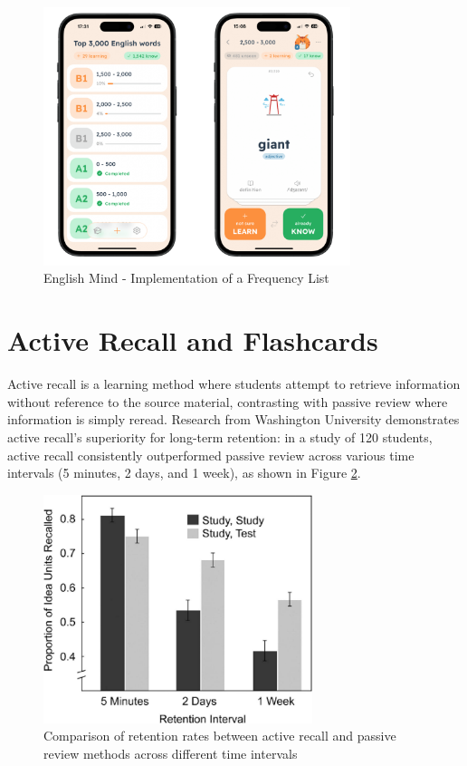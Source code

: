 \begin{figure}[!h]
    \includegraphics[width=0.8\textwidth]{src/figures/em-frequency-list.png}
    \caption{English Mind - Implementation of a Frequency List}
    \label{fig:em-frequency-list}
\end{figure}

\section{Active Recall and Flashcards}

Active recall is a learning method where students attempt to retrieve information without reference to the source material, contrasting with passive review where information is simply reread. Research from Washington University \cite{cite:rhkj2006_longterm_retention} demonstrates active recall's superiority for long-term retention: in a study of 120 students, active recall consistently outperformed passive review across various time intervals (5 minutes, 2 days, and 1 week), as shown in Figure \ref{fig:active-recall-passive-review-results}.

\begin{figure}[!h]
    \includegraphics[width=0.7\textwidth]{src/figures/active-recall-passive-review-results.jpeg}
    \caption{Comparison of retention rates between active recall and passive review methods across different time intervals \cite{cite:rhkj2006_longterm_retention}}
    \label{fig:active-recall-passive-review-results}
\end{figure}

